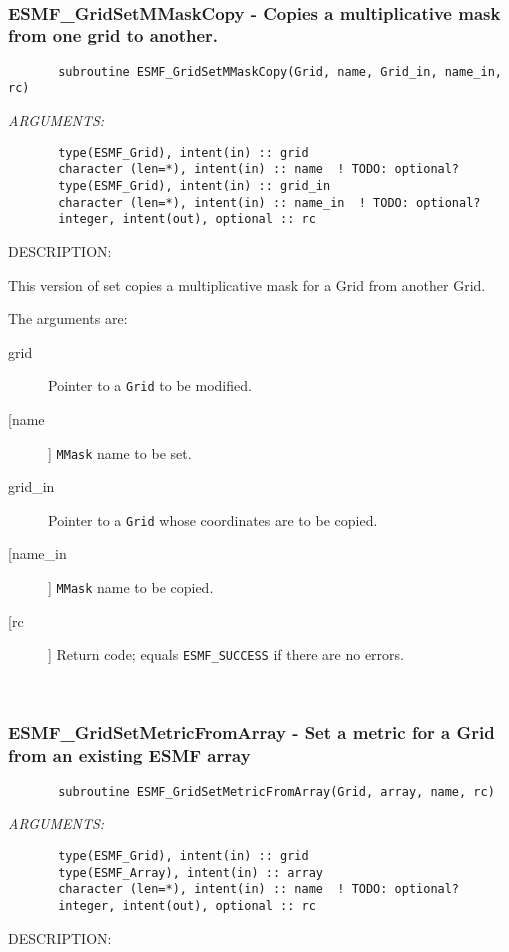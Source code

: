 {\mbox{}\hrulefill\ 
 
\subsubsection{ESMF\_GridSetMMaskCopy - Copies a multiplicative mask from one grid to another.}


 
\begin{verbatim}       subroutine ESMF_GridSetMMaskCopy(Grid, name, Grid_in, name_in, rc)\end{verbatim}{\em ARGUMENTS:}
\begin{verbatim}       type(ESMF_Grid), intent(in) :: grid
       character (len=*), intent(in) :: name  ! TODO: optional?
       type(ESMF_Grid), intent(in) :: grid_in
       character (len=*), intent(in) :: name_in  ! TODO: optional?
       integer, intent(out), optional :: rc            \end{verbatim}
{\sf DESCRIPTION:\\ }


       This version of set copies a multiplicative mask for a Grid from another
       Grid.
  
       The arguments are:
       \begin{description}
       \item[grid] 
            Pointer to a {\tt Grid} to be modified.
       \item [[name]]
             {\tt MMask} name to be set.
       \item[grid\_in] 
            Pointer to a {\tt Grid} whose coordinates are to be copied.
       \item [[name\_in]]
             {\tt MMask} name to be copied.
       \item[[rc]] 
            Return code; equals {\tt ESMF\_SUCCESS} if there are no errors.
       \end{description}
   
 
\mbox{}\hrulefill\ 
 
\subsubsection{ESMF\_GridSetMetricFromArray - Set a metric for a Grid from an existing ESMF array}


 
\begin{verbatim}       subroutine ESMF_GridSetMetricFromArray(Grid, array, name, rc)\end{verbatim}{\em ARGUMENTS:}
\begin{verbatim}       type(ESMF_Grid), intent(in) :: grid
       type(ESMF_Array), intent(in) :: array
       character (len=*), intent(in) :: name  ! TODO: optional?
       integer, intent(out), optional :: rc            \end{verbatim}
{\sf DESCRIPTION:\\ }


}
